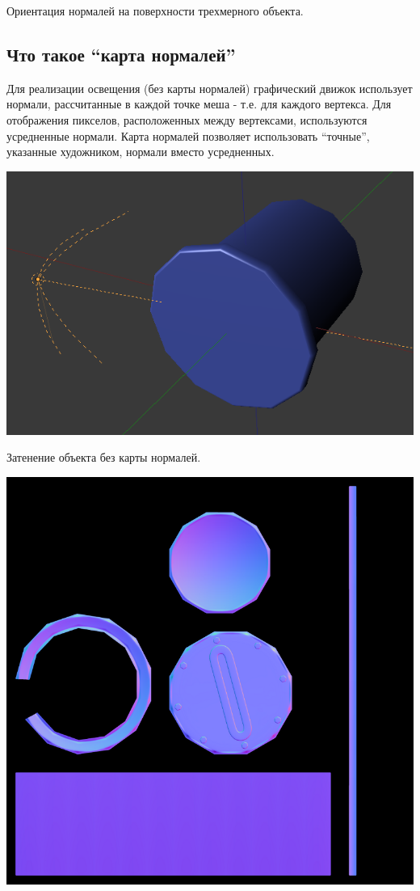 \documentclass[a4paper,12pt,oneside]{sphinxmanual}
\begin{document}
Ориентация нормалей на поверхности трехмерного объекта.


\subsection{Что такое ``карта нормалей''}
\label{assets_creation:id4}
Для реализации освещения (без карты нормалей) графический движок использует нормали, рассчитанные в каждой точке меша - т.е. для каждого вертекса. Для отображения пикселов, расположенных между вертексами, используются усредненные нормали. Карта нормалей позволяет использовать ``точные'', указанные художником, нормали вместо усредненных.

{\hfill\includegraphics[width=1.000\linewidth]{normals_3.png}\hfill}

Затенение объекта без карты нормалей.

{\hfill\includegraphics[width=1.000\linewidth]{normals_4.png}\hfill}
\end{document}
